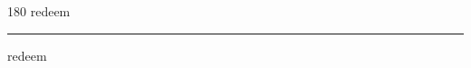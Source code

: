 
\begin{frame}
\begin{center}
\begin{turn}{180}
{\fontsize{2.5cm}{1em}\selectfont redeem}
\end{turn}
\vspace{1em}\par  
\hrule
\vspace{1em}\par  
{\fontsize{2.5cm}{1em}\selectfont redeem}
\end{center}
\end{frame}
